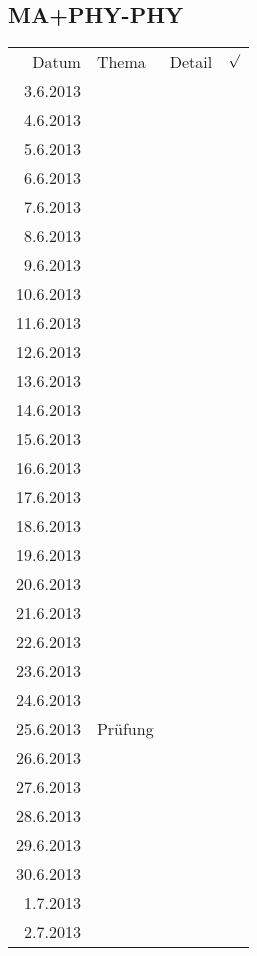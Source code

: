 \subsection{MA+PHY-PHY}
\begin{tabular}{r l p{} l}
\rowcolor{lgray} Datum     & Thema         & Detail & $\surd$ \\
\rowcolor{white}  3.6.2013 &               &  &  \\
\rowcolor{lgray}  4.6.2013 &               &  &  \\
\rowcolor{white}  5.6.2013 &               &  &  \\
\rowcolor{lgray}  6.6.2013 &               &  &  \\
\rowcolor{white}  7.6.2013 &               &  &  \\
\rowcolor{lgray}  8.6.2013 &               &  &  \\
\rowcolor{white}  9.6.2013 &               &  &  \\
\rowcolor{lgray} 10.6.2013 &               &  &  \\
\rowcolor{white} 11.6.2013 &               &  &  \\
\rowcolor{lgray} 12.6.2013 &               &  &  \\
\rowcolor{white} 13.6.2013 &               &  &  \\
\rowcolor{lgray} 14.6.2013 &               &  &  \\
\rowcolor{white} 15.6.2013 &               &  &  \\
\rowcolor{lgray} 16.6.2013 &               &  &  \\
\rowcolor{white} 17.6.2013 &               &  &  \\
\rowcolor{lgray} 18.6.2013 &               &  &  \\
\rowcolor{white} 19.6.2013 &               &  &  \\
\rowcolor{lgray} 20.6.2013 &               &  &  \\
\rowcolor{white} 21.6.2013 &               &  &  \\
\rowcolor{lgray} 22.6.2013 &               &  &  \\
\rowcolor{white} 23.6.2013 &               &  &  \\
\rowcolor{lgray} 24.6.2013 &               &  &  \\
\rowcolor{white} 25.6.2013 & Prüfung       &  &  \\
\rowcolor{lgray} 26.6.2013 &               &  &  \\
\rowcolor{white} 27.6.2013 &               &  &  \\
\rowcolor{lgray} 28.6.2013 &               &  &  \\
\rowcolor{white} 29.6.2013 &               &  &  \\
\rowcolor{lgray} 30.6.2013 &               &  &  \\
\rowcolor{white}  1.7.2013 &               &  &  \\
\rowcolor{lgray}  2.7.2013 &               &  &  \\
\end{tabular}
